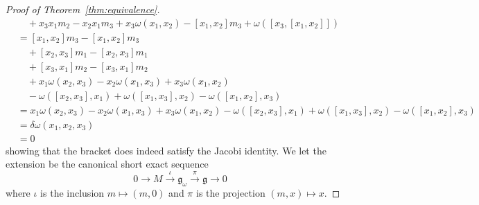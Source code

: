 \begin{proof}[Proof of Theorem~\ref{thm:equivalence}]
\begin{align*}
    &\quad+x_3x_1m_2 - x_2x_1m_3 + x_3\omega(x_1, x_2) - [x_1, x_2]m_3 + \omega([x_3, [x_1, x_2]]) \\
    &= [x_1, x_2]m_3 - [x_1, x_2]m_3 \\
    &\quad +[x_2, x_3]m_1 - [x_2, x_3]m_1 \\
    &\quad +[x_3, x_1]m_2 - [x_3, x_1]m_2 \\
    &\quad + x_1\omega(x_2, x_3) - x_2 \omega(x_1, x_3) +x_3\omega(x_1, x_2) \\
    &\quad -\omega([x_2, x_3], x_1) + \omega([x_1, x_3], x_2) - \omega([x_1, x_2], x_3) \\
    &= x_1\omega(x_2, x_3) - x_2 \omega(x_1, x_3) +x_3\omega(x_1, x_2)
     -\omega([x_2, x_3], x_1) + \omega([x_1, x_3], x_2) - \omega([x_1, x_2], x_3) \\
    &=\delta\omega(x_1, x_2, x_3)\\
    &= 0
  \end{align*}
  showing that the bracket does indeed satisfy the Jacobi identity. We let the extension be the canonical short exact sequence
  \begin{equation}
    0 \to M \xrightarrow{\iota} \mathfrak{g}_{\omega} \xrightarrow{\pi} \mathfrak{g} \to 0
  \end{equation}
  where $ \iota $ is the inclusion $ m \mapsto (m, 0) $ and $ \pi $ is the projection $ (m, x) \mapsto x $.


\end{proof}
